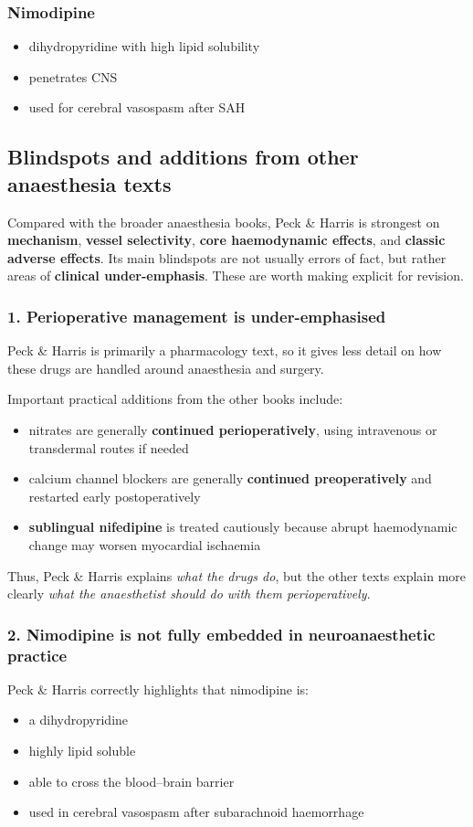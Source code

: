 \documentclass[11pt,a4paper]{article}
\begin{document}
\subsubsection*{Nimodipine}
\begin{itemize}
    \item dihydropyridine with high lipid solubility
    \item penetrates CNS
    \item used for cerebral vasospasm after SAH
\end{itemize}

\subsection{Blindspots and additions from other anaesthesia texts}

Compared with the broader anaesthesia books, Peck \& Harris is strongest on \textbf{mechanism}, \textbf{vessel selectivity}, \textbf{core haemodynamic effects}, and \textbf{classic adverse effects}. Its main blindspots are not usually errors of fact, but rather areas of \textbf{clinical under-emphasis}. These are worth making explicit for revision.

\subsubsection*{1. Perioperative management is under-emphasised}
Peck \& Harris is primarily a pharmacology text, so it gives less detail on how these drugs are handled around anaesthesia and surgery.

Important practical additions from the other books include:
\begin{itemize}
    \item nitrates are generally \textbf{continued perioperatively}, using intravenous or transdermal routes if needed
    \item calcium channel blockers are generally \textbf{continued preoperatively} and restarted early postoperatively
    \item \textbf{sublingual nifedipine} is treated cautiously because abrupt haemodynamic change may worsen myocardial ischaemia
\end{itemize}

Thus, Peck \& Harris explains \emph{what the drugs do}, but the other texts explain more clearly \emph{what the anaesthetist should do with them perioperatively}.

\subsubsection*{2. Nimodipine is not fully embedded in neuroanaesthetic practice}
Peck \& Harris correctly highlights that nimodipine is:
\begin{itemize}
    \item a dihydropyridine
    \item highly lipid soluble
    \item able to cross the blood--brain barrier
    \item used in cerebral vasospasm after subarachnoid haemorrhage
\end{itemize}
\end{document}
